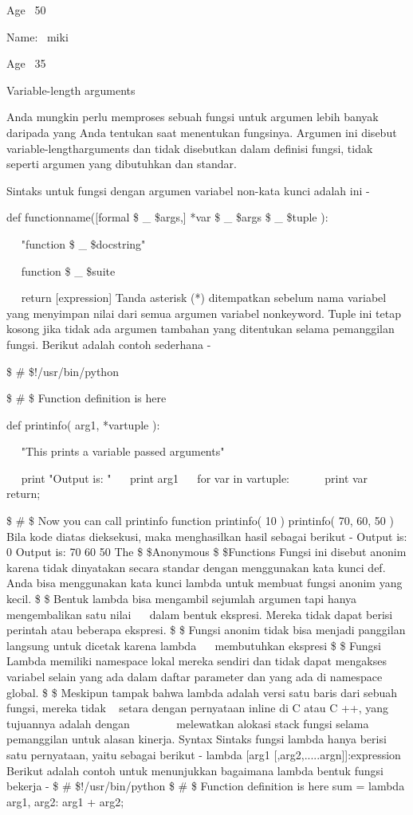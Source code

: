 Age~ 50 

Name:~ miki

Age~ 35 

Variable-length arguments 

Anda mungkin perlu memproses sebuah fungsi untuk argumen lebih banyak daripada yang Anda tentukan saat menentukan fungsinya. Argumen ini disebut variable-lengtharguments dan tidak disebutkan dalam definisi fungsi, tidak seperti argumen yang dibutuhkan dan standar. 

Sintaks untuk fungsi dengan argumen variabel non-kata kunci adalah ini -

def functionname([formal \$  \_  \$args,] *var \$  \_  \$args \$  \_  \$tuple ): 

~~ "function \$  \_  \$docstring" 

~~ function \$  \_  \$suite 

~~ return [expression]
Tanda asterisk (*) ditempatkan sebelum nama variabel yang menyimpan nilai dari semua argumen variabel nonkeyword. Tuple ini tetap kosong jika tidak ada argumen tambahan yang ditentukan selama pemanggilan fungsi. Berikut adalah contoh sederhana - 

\$  \#  \$!/usr/bin/python 

\$  \#  \$ Function definition is here 

def printinfo( arg1, *vartuple ): 

~~ "This prints a variable passed arguments" 

~~ print "Output is: " 
~~ print arg1
~~ for var in vartuple:
~~~~~ print var 
~~ return; 

\$  \#  \$ Now you can call printinfo function
printinfo( 10 ) 
printinfo( 70, 60, 50 ) 
Bila kode diatas dieksekusi, maka menghasilkan hasil sebagai berikut - 
Output is: 
0
Output is: 
70 
60 
50 
The \$  \$Anonymous \$  \$Functions 
Fungsi ini disebut anonim karena tidak dinyatakan secara standar dengan menggunakan kata kunci def. Anda bisa menggunakan kata kunci lambda untuk membuat fungsi anonim yang kecil. 
\$ \bullet \$ Bentuk lambda bisa mengambil sejumlah argumen tapi hanya mengembalikan satu nilai   ~~ dalam bentuk ekspresi. Mereka tidak dapat berisi perintah atau beberapa ekspresi. 
   \$ \bullet \$ Fungsi anonim tidak bisa menjadi panggilan langsung untuk dicetak karena lambda   ~~ membutuhkan ekspresi 
   \$ \bullet \$ Fungsi Lambda memiliki namespace lokal mereka sendiri dan tidak dapat mengakses   ~ variabel selain yang ada dalam daftar parameter dan yang ada di namespace global. 
   \$ \bullet \$ Meskipun tampak bahwa lambda adalah versi satu baris dari sebuah fungsi, mereka tidak   ~ setara dengan pernyataan inline di C atau C ++, yang tujuannya adalah dengan   ~~~~~~~ melewatkan alokasi stack fungsi selama pemanggilan untuk alasan kinerja. 
Syntax 
Sintaks fungsi lambda hanya berisi satu pernyataan, yaitu sebagai berikut - 
  lambda [arg1 [,arg2,.....argn]]:expression 
Berikut adalah contoh untuk menunjukkan bagaimana lambda bentuk fungsi bekerja -
   \$  \#  \$!/usr/bin/python 
   \$  \#  \$ Function definition is here 
  sum = lambda arg1, arg2: arg1 + arg2;


